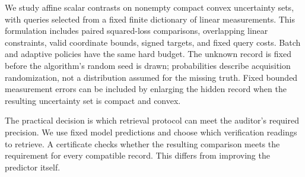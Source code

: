 \documentclass[12pt]{article}
\begin{document}
We study affine scalar contrasts on nonempty compact convex uncertainty
sets, with queries selected from a fixed finite dictionary of linear
measurements. This formulation includes paired squared-loss comparisons,
overlapping linear constraints, valid coordinate bounds, signed targets,
and fixed query costs. Batch and adaptive policies have the same hard
budget. The unknown record is fixed before the algorithm's random seed is
drawn; probabilities describe acquisition randomization, not a distribution
assumed for the missing truth. Fixed bounded measurement errors can be
included by enlarging the hidden record when the resulting uncertainty set
is compact and convex.

The practical decision is which retrieval protocol can meet the auditor's
required precision. We use fixed model predictions and choose which
verification readings to retrieve. A certificate checks whether the resulting
comparison meets the requirement for every compatible record. This differs
from improving the predictor itself.
\end{document}
